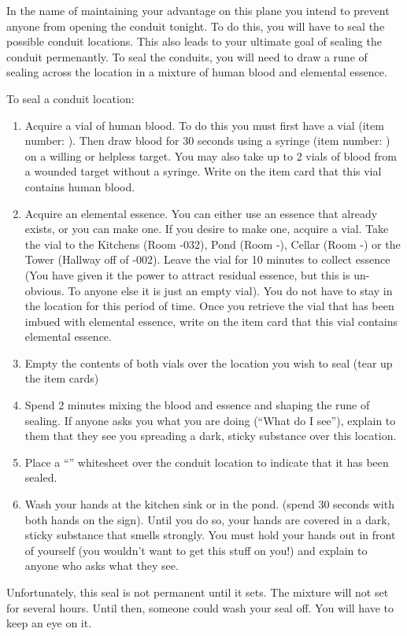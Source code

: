 \documentclass[green]{elementals}
\begin{document}
\name{\gSealingLocations{}}

In the name of maintaining your advantage on this plane you intend to prevent anyone from opening the conduit tonight.  To do this, you will have to seal the possible conduit locations. This also leads to your ultimate goal of sealing the conduit permenantly. To seal the conduits, you will need to draw a rune of sealing across the location in a mixture of human blood and elemental essence.

To seal a conduit location:
\begin{enumerate}
  \item Acquire a vial of human blood. To do this you must first have a vial (item number: ). Then draw blood for 30 seconds using a syringe (item number: ) on a willing or helpless target. You may also take up to 2 vials of blood from a wounded target without a syringe. Write on the item card that this vial contains human blood.
  \item Acquire an elemental essence. You can either use an essence that already exists, or you can make one. If you desire to make one, acquire a vial. Take the vial to the Kitchens (Room -032), Pond (Room -), Cellar (Room -) or the Tower (Hallway off of -002). Leave the vial for 10 minutes to collect essence (You have given it the power to attract residual essence, but this is un-obvious. To anyone else it is just an empty vial). You do not have to stay in the location for this period of time. Once you retrieve the vial that has been imbued with elemental essence, write on the item card that this vial contains elemental essence.
  \item Empty the contents of both vials over the location you wish to seal (tear up the item cards)
  \item Spend 2 minutes mixing the blood and essence and shaping the rune of sealing. If anyone asks you what you are doing (``What do I see''), explain to them that they see you spreading a dark, sticky substance over this location.
  \item Place a ``\wSealedConduit{}'' whitesheet over the conduit location to indicate that it has been sealed.
  \item Wash your hands at the kitchen sink or in the pond. (spend 30 seconds with both hands on the sign). Until you do so, your hands are covered in a dark, sticky substance that smells strongly. You must hold your hands out in front of yourself (you wouldn't want to get this stuff on you!) and explain to anyone who asks what they see.
\end{enumerate}

Unfortunately, this seal is not permanent until it sets. The mixture will not set for several hours. Until then, someone could wash your seal off. You will have to keep an eye on it.
\end{document}

